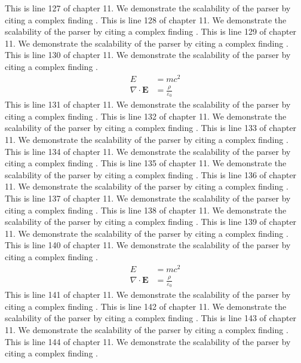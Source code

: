 This is line 127 of chapter 11. We demonstrate the scalability of the parser by citing a complex finding \cite{ref11_127}.
This is line 128 of chapter 11. We demonstrate the scalability of the parser by citing a complex finding \cite{ref11_128}.
This is line 129 of chapter 11. We demonstrate the scalability of the parser by citing a complex finding \cite{ref11_129}.
This is line 130 of chapter 11. We demonstrate the scalability of the parser by citing a complex finding \cite{ref11_130}.
\begin{align*}
  E &= mc^2 \\
  \nabla \cdot \mathbf{E} &= \frac{\rho}{\varepsilon_0}
\end{align*}
This is line 131 of chapter 11. We demonstrate the scalability of the parser by citing a complex finding \cite{ref11_131}.
This is line 132 of chapter 11. We demonstrate the scalability of the parser by citing a complex finding \cite{ref11_132}.
This is line 133 of chapter 11. We demonstrate the scalability of the parser by citing a complex finding \cite{ref11_133}.
This is line 134 of chapter 11. We demonstrate the scalability of the parser by citing a complex finding \cite{ref11_134}.
This is line 135 of chapter 11. We demonstrate the scalability of the parser by citing a complex finding \cite{ref11_135}.
This is line 136 of chapter 11. We demonstrate the scalability of the parser by citing a complex finding \cite{ref11_136}.
This is line 137 of chapter 11. We demonstrate the scalability of the parser by citing a complex finding \cite{ref11_137}.
This is line 138 of chapter 11. We demonstrate the scalability of the parser by citing a complex finding \cite{ref11_138}.
This is line 139 of chapter 11. We demonstrate the scalability of the parser by citing a complex finding \cite{ref11_139}.
This is line 140 of chapter 11. We demonstrate the scalability of the parser by citing a complex finding \cite{ref11_140}.
\begin{align*}
  E &= mc^2 \\
  \nabla \cdot \mathbf{E} &= \frac{\rho}{\varepsilon_0}
\end{align*}
This is line 141 of chapter 11. We demonstrate the scalability of the parser by citing a complex finding \cite{ref11_141}.
This is line 142 of chapter 11. We demonstrate the scalability of the parser by citing a complex finding \cite{ref11_142}.
This is line 143 of chapter 11. We demonstrate the scalability of the parser by citing a complex finding \cite{ref11_143}.
This is line 144 of chapter 11. We demonstrate the scalability of the parser by citing a complex finding \cite{ref11_144}.
